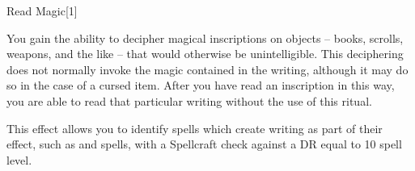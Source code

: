 \begin{spellsection}{Read Magic}[1]
    \begin{spellheader}
    \end{spellheader}
    \begin{spellcontent}
        \begin{spelltargetinginfo}
        \end{spelltargetinginfo}
        \begin{spelleffects}
            \spelleffect You gain the ability to decipher magical inscriptions on objects -- books, scrolls, weapons, and the like -- that would otherwise be unintelligible. This deciphering does not normally invoke the magic contained in the writing, although it may do so in the case of a cursed item. After you have read an inscription in this way, you are able to read that particular writing without the use of this ritual.

            This effect allows you to identify spells which create writing as part of their effect, such as  and  spells, with a Spellcraft check against a DR equal to 10 \add spell level.
            \spelldur \durlong
        \end{spelleffects}
    \end{spellcontent}
    \begin{spellfooter}
    \end{spellfooter}
    \begin{spellaugments}
    \end{spellaugments}
\end{spellsection}

